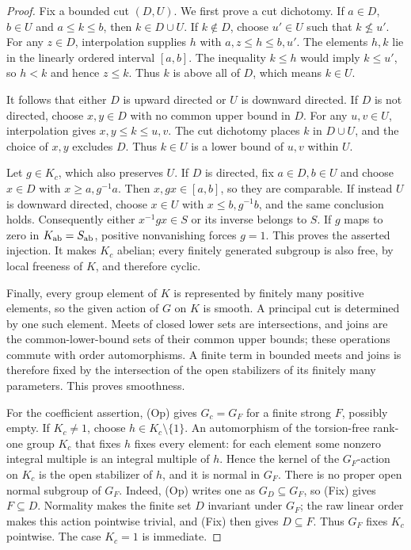 \begin{proof}
Fix a bounded cut $(D,U)$. We first prove a cut dichotomy.
If $a\in D$, $b\in U$ and $a\le k\le b$, then
$k\in D\cup U$. If $k\notin D$, choose $u'\in U$ such that
$k\not\le u'$. For any $z\in D$, interpolation supplies
$h$ with $a,z\le h\le b,u'$. The elements $h,k$ lie in the
linearly ordered interval $[a,b]$. The inequality $k\le h$
would imply $k\le u'$, so $h<k$ and hence $z\le k$.
Thus $k$ is above all of $D$, which means $k\in U$.

It follows that either $D$ is upward directed or $U$ is
downward directed. If $D$ is not directed, choose $x,y\in D$
with no common upper bound in $D$. For any $u,v\in U$,
interpolation gives $x,y\le k\le u,v$. The cut dichotomy
places $k$ in $D\cup U$, and the choice of $x,y$ excludes
$D$. Thus $k\in U$ is a lower bound of $u,v$ within $U$.

Let $g\in K_c$, which also preserves $U$. If $D$ is directed,
fix $a\in D,b\in U$ and choose $x\in D$ with
$x\ge a,g^{-1}a$. Then $x,gx\in[a,b]$, so they are comparable.
If instead $U$ is downward directed, choose $x\in U$ with
$x\le b,g^{-1}b$, and the same conclusion holds.
Consequently either $x^{-1}gx\in S$ or its inverse belongs
to $S$. If $g$ maps to zero in $K_{\mathrm{ab}}=S_{\mathrm{ab}}$, positive
nonvanishing forces $g=1$. This proves the asserted injection.
It makes $K_c$ abelian; every finitely generated subgroup is
also free, by local freeness of $K$, and therefore cyclic.

Finally, every group element of $K$ is represented by finitely
many positive elements, so the given action of $G$ on $K$ is
smooth. A principal cut is determined by one such element.
Meets of closed lower sets are intersections, and joins are
the common-lower-bound sets of their common upper bounds;
these operations commute with order automorphisms. A finite
term in bounded meets and joins is therefore fixed by the
intersection of the open stabilizers of its finitely many
parameters. This proves smoothness.

For the coefficient assertion, (Op) gives $G_c=G_F$ for a
finite strong $F$, possibly empty. If $K_c\ne1$, choose
$h\in K_c\setminus\{1\}$. An automorphism of the torsion-free
rank-one group $K_c$ that fixes $h$ fixes every element:
for each element some nonzero integral multiple is an integral
multiple of $h$. Hence the kernel of the $G_F$-action on $K_c$
is the open stabilizer of $h$, and it is normal in $G_F$.
There is no proper open normal subgroup of $G_F$. Indeed,
(Op) writes one as $G_D\subseteq G_F$, so (Fix) gives
$F\subseteq D$. Normality makes the finite set $D$ invariant
under $G_F$; the raw linear order makes this action pointwise
trivial, and (Fix) then gives $D\subseteq F$.
Thus $G_F$ fixes $K_c$ pointwise. The case $K_c=1$ is immediate.


\end{proof}
